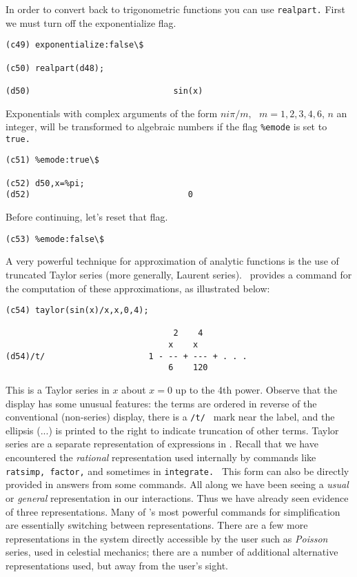 In order to convert back to trigonometric functions you can use
{\tt  realpart.}
First we must turn off the exponentialize flag.
\begin{verbatim}
(c49) exponentialize:false\$

(c50) realpart(d48);

(d50)                             sin(x)
\end{verbatim}

Exponentials with complex arguments of the form
$n i \pi / m , \ \ \ m = 1,2,3,4,6$, $n$  an integer, will be transformed
to algebraic numbers if the flag {\tt \%emode}
is set to 
{\tt true.}
\begin{verbatim}
(c51) %emode:true\$

(c52) d50,x=%pi;
(d52)                                0
\end{verbatim}

Before continuing, let's reset that flag.
\begin{verbatim}
(c53) %emode:false\$
\end{verbatim}

A very powerful technique for approximation of analytic functions
is the use of truncated Taylor series (more generally, Laurent series).
\Max\ provides a command for the computation of these approximations, as
illustrated below:
\begin{verbatim}
(c54) taylor(sin(x)/x,x,0,4);

                                  2    4
                                 x    x
(d54)/t/                     1 - -- + --- + . . .
                                 6    120
\end{verbatim}

This is a Taylor series in $x$ about
$x=0$ up to the 4th power.  Observe that the display
has
some unusual features: the terms are ordered in reverse of
the conventional (non-series) display, there is a {\tt /t/ }
mark near the
label, and the ellipsis (...) is printed to the right to indicate
truncation of other terms.
Taylor series are a separate representation of expressions in
\Max.
Recall that we have
encountered the {\it rational} representation
used internally by commands like {\tt ratsimp, factor,}
and sometimes in
{\tt integrate. }
This form can also be directly provided in answers from
some commands. All along we have been seeing
a {\it usual} or {\it general} representation in our interactions.
Thus we have already seen evidence of three representations. Many of
\Max's
most powerful commands for simplification
are essentially switching between representations.
There are a few more representations in the system directly
accessible by the user such as 
{\it Poisson} series, used in celestial mechanics; there are a
number of additional alternative representations used, but
away from the user's sight.

